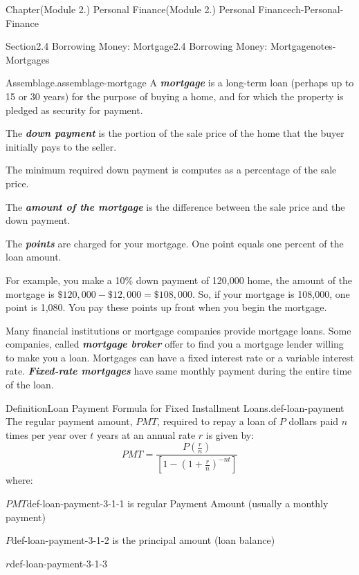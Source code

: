 \documentclass[oneside,10pt,]{book}
\newcommand{\alert}[1]{\textbf{\textit{#1}}}
\begin{document}
\begin{chapterptx}{Chapter}{(Module 2.) Personal Finance}{}{(Module 2.) Personal Finance}{}{}{ch-Personal-Finance}
\begin{sectionptx}{Section}{2.4 Borrowing Money: Mortgage}{}{2.4 Borrowing Money: Mortgage}{}{}{notes-Mortgages}
\begin{assemblage}{Assemblage}{.}{assemblage-mortgage}%
A \alert{mortgage} is a long-term loan (perhaps up to 15 or 30 years) for the purpose of buying a home, and for which the property is pledged as security for payment.%
\par
The \alert{down payment} is the portion of the sale price of the home that the buyer initially pays to the seller.%
\par
The minimum required down payment is computes as a percentage of the sale price.%
\par
The \alert{amount of the mortgage} is the difference between the sale price and the down payment.%
\par
The \alert{points} are charged for your mortgage. One point equals one percent of the loan amount.%
\end{assemblage}
For example, you make a 10\% down payment of \textdollar{}120,000 home, the amount of the mortgage is \(\$120,000-\$12,000 =\$108,000\). So, if your mortgage is \textdollar{}108,000, one point is \textdollar{}1,080. You pay these points up front when you begin the mortgage.%
\par
Many financial institutions or mortgage companies provide mortgage loans. Some companies, called \alert{mortgage broker} offer to find you a mortgage lender willing to make you a loan. Mortgages can have a fixed interest rate or a variable interest rate. \alert{Fixed-rate mortgages} have same monthly payment during the entire time of the loan.%
\begin{definition}{Definition}{Loan Payment Formula for Fixed Installment Loans.}{def-loan-payment}%
The regular payment amount, \(PMT\), required to repay a loan of \(P\) dollars paid \(n\) times per year over \(t\) years at an annual rate \(r\) is given by:%
\begin{equation}
PMT = \frac{P\left(\frac{r}{n}\right)}{\left[1-\left(1+\frac{r}{n}\right)^{-nt}\right]}\label{eqn-loan-formula}
\end{equation}
%
where:%
\begin{descriptionlist}
\begin{dlimedium}{\(PMT\)}{def-loan-payment-3-1-1}%
is regular Payment Amount (usually a monthly payment)%
\end{dlimedium}%
\begin{dlimedium}{\(P\)}{def-loan-payment-3-1-2}%
is the principal amount (loan balance)%
\end{dlimedium}%
\begin{dlimedium}{\(r\)}{def-loan-payment-3-1-3}%

\end{dlimedium}
\end{descriptionlist}
\end{definition}
\end{sectionptx}
\end{chapterptx}
\end{document}
